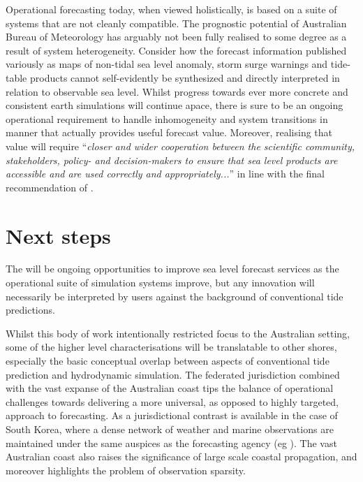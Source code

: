 Operational forecasting today, when viewed holistically, is based on a suite of systems that are not cleanly compatible.
The prognostic potential of Australian Bureau of Meteorology has arguably not been fully realised to some degree as a result of system heterogeneity.  Consider how the forecast information published variously as maps of non-tidal sea level anomaly, storm surge warnings and tide-table products cannot self-evidently be synthesized and directly interpreted in relation to observable sea level.
Whilst progress towards ever more concrete and consistent earth simulations will continue apace, there is sure to be an ongoing operational requirement to handle inhomogeneity and system transitions in manner that actually provides useful forecast value. Moreover, realising that value will require ``\textit{closer and wider cooperation between the scientific community, stakeholders, policy- and decision-makers to ensure that sea level products are accessible and are used correctly and appropriately...}'' in line with the final recommendation of \citet{10.1175/bams-89-4-459}. 

\section{Next steps}
The will be ongoing opportunities to improve sea level forecast services as the operational suite of simulation systems improve, but any innovation will necessarily be interpreted by users against the background of conventional tide predictions.

Whilst this body of work intentionally restricted focus to the Australian setting, some of the higher level  characterisations will be translatable to other shores, especially the basic conceptual overlap between aspects of conventional tide prediction and hydrodynamic simulation.
The federated jurisdiction combined with the vast expanse of the Australian coast tips the balance of operational challenges towards delivering a more universal, as opposed to highly targeted, approach to forecasting.   As a jurisdictional contrast is available in the case of South Korea, where a dense network of weather and marine observations are maintained under the same auspices as the forecasting agency (eg   
\citep{10.1007/s10236-015-0820-3}).
The vast Australian coast also raises the significance of large scale coastal propagation, and moreover highlights the problem of observation sparsity.


